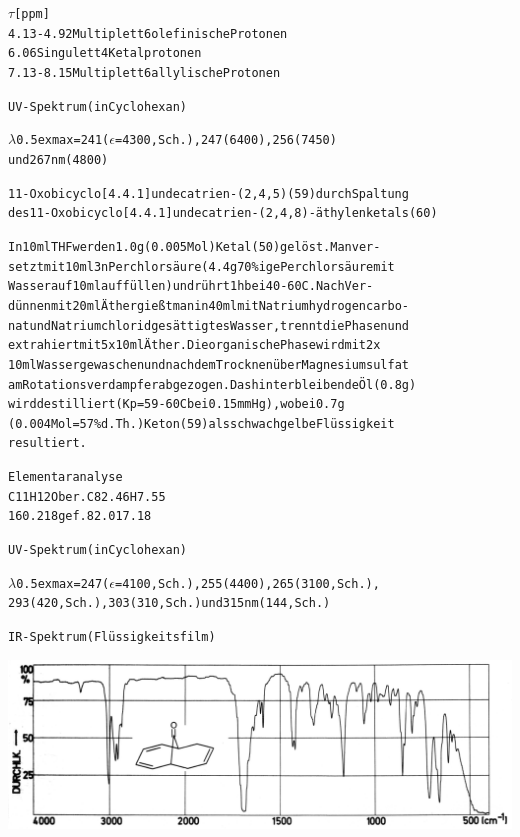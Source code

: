 \documentclass[a4paper,11pt]{article}
\begin{document}
\begin{alltt}
\newpage
{}


  \(\tau\) [ppm]
4.13 - 4.92    Multiplett        6 olefinische Protonen
6.06           Singulett         4 Ketalprotonen
7.13 - 8.15    Multiplett        6 allylische Protonen

UV-Spektrum (in Cyclohexan)

\(\lambda\)\lower0.5ex\hbox{max} = 241 (\(\epsilon\) = 4300, Sch.), 247 (6400), 256 (7450)
             und 267 nm (4800)

11-Oxobicyclo[4.4.1]undecatrien-(2,4,5) (59) durch Spaltung
des 11-Oxobicyclo[4.4.1]undecatrien-(2,4,8)-äthylenketals (60)

In 10 ml THF werden 1.0 g (0.005 Mol) Ketal (50) gelöst. Man ver-
setzt mit 10 ml 3 n Perchlorsäure (4.4 g 70 \%ige Perchlorsäure mit
Wasser auf 10 ml auffüllen) und rührt 1 h bei 40 - 60\degree{}C. Nach Ver-
dünnen mit 20 ml Äther gießt man in 40 ml mit Natriumhydrogencarbo-
nat und Natriumchlorid gesättigtes Wasser, trennt die Phasen und
extrahiert mit 5 x 10 ml Äther. Die organische Phase wird mit 2 x
10 ml Wasser gewaschen und nach dem Trocknen über Magnesiumsulfat
am Rotationsverdampfer abgezogen. Das hinterbleibende Öl (0.8 g)
wird destilliert (Kp = 59 - 60\degree{}C bei 0.15 mm Hg), wobei 0.7 g
(0.004 Mol = 57 \% d.Th.) Keton (59) als schwach gelbe Flüssigkeit
resultiert.

Elementaranalyse
C11H12O     ber.   C 82.46     H   7.55
160.218     gef.     82.01         7.18

UV-Spektrum (in Cyclohexan)

\(\lambda\)\lower0.5ex\hbox{max} = 247 (\(\epsilon\) = 4100, Sch.), 255 (4400), 265 (3100, Sch.),
             293 (420, Sch.), 303 (310, Sch.) und 315 nm (144, Sch.)

\newpage
{}


IR-Spektrum (Flüssigkeitsfilm)
\end{alltt}
\hspace*{-0.5cm}\includegraphics[width=14.38cm]{IR_040}
\end{document}
